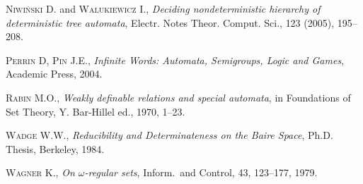 \begin{thebibliography}{00}
\textsc{Niwiński} D. and \textsc{Walukiewicz} I., \emph{Deciding nondeterministic hierarchy of deterministic tree automata},
Electr. Notes Theor. Comput. Sci., \textsc{123} (2005), 195--208.


\textsc{Perrin} D, \textsc{Pin} J.E., \emph{Infinite Words: Automata, Semigroups, Logic and Games}, Academic Press, \textsc{2004}.

\textsc{Rabin} M.O., \emph{Weakly definable relations and special automata}, in Foundations of Set Theory, Y. Bar-Hillel ed., \textsc{1970}, 1--23.

\textsc{Wadge} W.W., \emph{Reducibility and Determinateness on the Baire Space}, Ph.D. Thesis, Berkeley, \textsc{1984}.

\textsc{Wagner} K., \emph{On $\omega$-regular sets}, Inform.~and Control, \textsc{43}, 123--177, 1979. 

\end{thebibliography}

